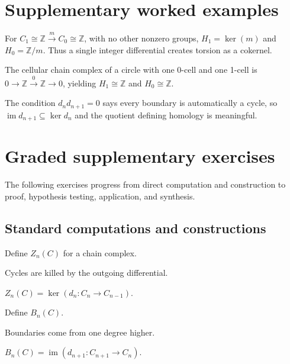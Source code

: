 \section{Supplementary worked examples}
\label{sec:viii16-pedagogy}

\begin{example}\label{ex:viii16-ped-01}
For $C_1\cong\mathbb Z\xrightarrow{m}C_0\cong\mathbb Z$, with no other nonzero groups, $H_1=\ker(m)$ and $H_0=\mathbb Z/m$.  Thus a single integer differential creates torsion as a cokernel.
\end{example}

\begin{example}\label{ex:viii16-ped-02}
The cellular chain complex of a circle with one 0-cell and one 1-cell is $0\to\mathbb Z\xrightarrow{0}\mathbb Z\to0$, yielding $H_1\cong\mathbb Z$ and $H_0\cong\mathbb Z$.
\end{example}

\begin{example}[Why $d^2=0$ matters]\label{ex:viii16-ped-03}
The condition $d_nd_{n+1}=0$ says every boundary is automatically a cycle, so $\operatorname{im}d_{n+1}\subseteq\ker d_n$ and the quotient defining homology is meaningful.
\end{example}

\section{Graded supplementary exercises}
The following exercises progress from direct computation and construction to proof, hypothesis testing, application, and synthesis.

\subsection*{Standard computations and constructions}

\begin{exercise}\label{exr:viii16-ped-01}
Define $Z_n(C)$ for a chain complex.
\end{exercise}
\begin{hint}
Cycles are killed by the outgoing differential.
\end{hint}
\begin{solution}
$Z_n(C)=\ker(d_n:C_n\to C_{n-1})$.
\end{solution}

\begin{exercise}\label{exr:viii16-ped-02}
Define $B_n(C)$.
\end{exercise}
\begin{hint}
Boundaries come from one degree higher.
\end{hint}
\begin{solution}
$B_n(C)=\operatorname{im}(d_{n+1}:C_{n+1}\to C_n)$.
\end{solution}

